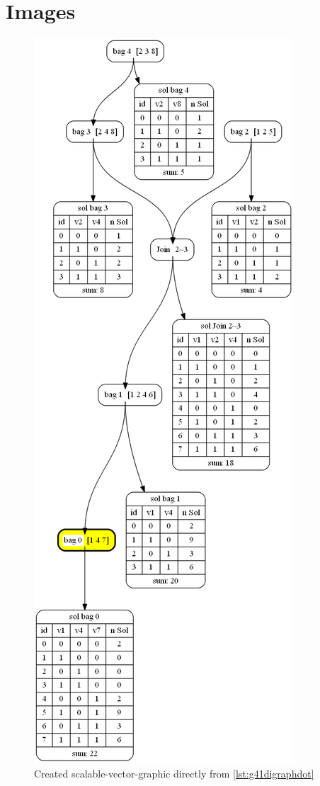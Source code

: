 \documentclass[a4paper, 12pt, bibliography=totoc]{scrartcl}
\begin{document}
\section{Images}
\begin{figure}
	\centering
	\includegraphics[height=\textheight]{images/g41digraphdot.png}
	\caption{Created scalable-vector-graphic directly from \ref{lst:g41digraphdot}}
	\label{fig:g41Digraph}
\end{figure}
\end{document}
